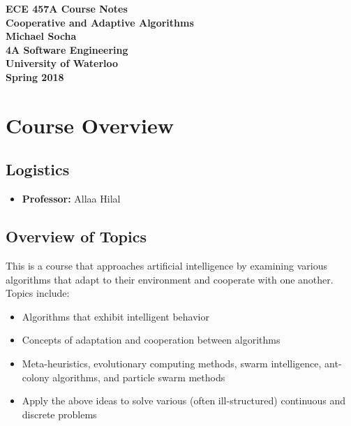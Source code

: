 \documentclass[12pt,titlepage]{article}
\begin{document}
  \begin{titlepage}
    \vspace*{\fill}
    \centering

    \textbf{\Huge ECE 457A Course Notes} \\ [0.4em]
    \textbf{\Large Cooperative and Adaptive Algorithms} \\ [1em]
    \textbf{\Large Michael Socha} \\ [1em]
    \textbf{\large 4A Software Engineering} \\
    \textbf{\large University of Waterloo} \\
    \textbf{\large Spring 2018} \\
    \vspace*{\fill}
  \end{titlepage}

  \newpage 

  \tableofcontents

  \newpage

  \section{Course Overview}
    \subsection{Logistics}
      \begin{itemize}
        \item \textbf{Professor:} Allaa Hilal
      \end{itemize}

    \subsection{Overview of Topics}
      This is a course that approaches artificial intelligence by examining various algorithms that adapt to their
      environment and cooperate with one another. Topics include:
      \begin{itemize}
        \item Algorithms that exhibit intelligent behavior
        \item Concepts of adaptation and cooperation between algorithms
        \item Meta-heuristics, evolutionary computing methods, swarm intelligence, ant-colony algorithms, and particle
        swarm methods
        \item Apply the above ideas to solve various (often ill-structured) continuous and discrete problems
      \end{itemize}
\end{document}
